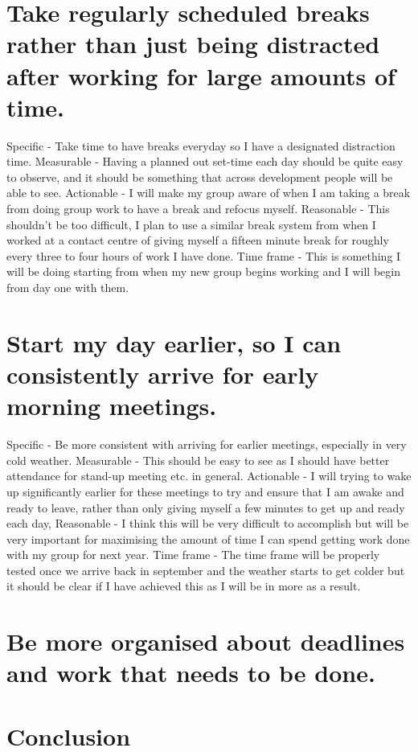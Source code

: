 \documentclass{scrartcl}
\begin{document}
\section{Take regularly scheduled breaks rather than just being distracted after working for large amounts of time.}

Specific - Take time to have breaks everyday so I have a designated distraction time.
Measurable - Having a planned out set-time each day should be quite easy to observe, and it should be something that across development people will be able to see.
Actionable - I will make my group aware of when I am taking a break from doing group work to have a break and refocus myself.
Reasonable - This shouldn't be too difficult, I plan to use a similar break system from when I worked at a contact centre of giving myself a fifteen minute break for roughly every three to four hours of work I have done.
Time frame - This is something I will be doing starting from when my new group begins working and I will begin from day one with them.

\section{Start my day earlier, so I can consistently arrive for early morning meetings.}

Specific - Be more consistent with arriving for earlier meetings, especially in very cold weather.
Measurable - This should be easy to see as I should have better attendance for stand-up meeting etc. in general.
Actionable - I will trying to wake up significantly earlier for these meetings to try and ensure that I am awake and ready to leave, rather than only giving myself a few minutes to get up and ready each day,
Reasonable - I think this will be very difficult to accomplish but will be very important for maximising the amount of time I can spend getting work done with my group for next year.
Time frame - The time frame will be properly tested once we arrive back in september and the weather starts to get colder but it should be clear if I have achieved this as I will be in more as a result.

\section{Be more organised about deadlines and work that needs to be done.}

\section*{Conclusion}
\end{document}
